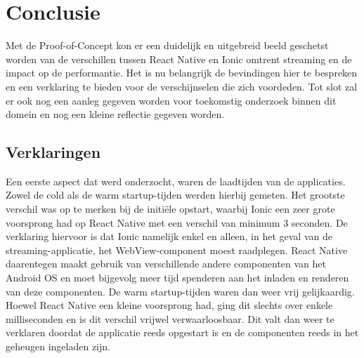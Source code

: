 
\chapter{Conclusie}%
\label{ch:conclusie}


Met de Proof-of-Concept kon er een duidelijk en uitgebreid beeld geschetst worden van de verschillen tussen React Native en Ionic omtrent streaming en de impact op de performantie. Het is nu belangrijk de bevindingen hier te bespreken en een verklaring te bieden voor de verschijnselen die zich voordeden. Tot slot zal er ook nog een aanleg gegeven worden voor toekomstig onderzoek binnen dit domein en nog een kleine reflectie gegeven worden.

\section{Verklaringen}
\label{sec:verklaringen}

Een eerste aspect dat werd onderzocht, waren de laadtijden van de applicaties. Zowel de cold als de warm startup-tijden werden hierbij gemeten. Het grootste verschil was op te merken bij de initiële opstart, waarbij Ionic een zeer grote voorsprong had op React Native met een verschil van minimum 3 seconden. De verklaring hiervoor is dat Ionic namelijk enkel en alleen, in het geval van de streaming-applicatie, het WebView-component moest raadplegen. React Native daarentegen maakt gebruik van verschillende andere componenten van het Android OS en moet bijgevolg meer tijd spenderen aan het inladen en renderen van deze componenten. De warm startup-tijden waren dan weer vrij gelijkaardig. Hoewel React Native een kleine voorsprong had, ging dit slechts over enkele milliseconden en is dit verschil vrijwel verwaarloosbaar. Dit valt dan weer te verklaren doordat de applicatie reeds opgestart is en de componenten reeds in het geheugen ingeladen zijn.

